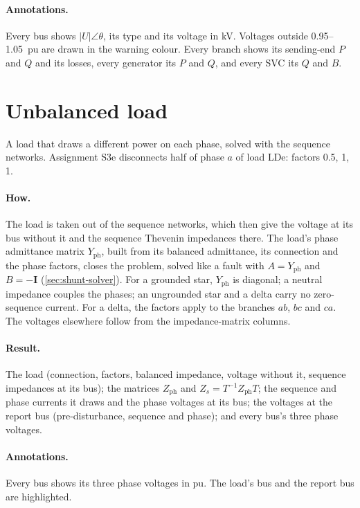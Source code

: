 \paragraph{Annotations.} Every bus shows $|U|\angle\theta$, its type and its voltage in kV.
Voltages outside 0.95--1.05~pu are drawn in the warning colour. Every branch shows its
sending-end $P$ and $Q$ and its losses, every generator its $P$ and $Q$, and every SVC
its $Q$ and $B$.

\section{Unbalanced load}\label{sec:study-unbalanced}

A load that draws a different power on each phase, solved with the sequence networks.
Assignment S3e disconnects half of phase $a$ of load LDe: factors 0.5, 1, 1.



\paragraph{How.} The load is taken out of the sequence networks, which then give the
voltage at its bus without it and the sequence Thevenin impedances there. The load's
phase admittance matrix $Y_\text{ph}$, built from its balanced admittance, its connection
and the phase factors, closes the problem, solved like a fault with $A = Y_\text{ph}$ and
$B = -\mathbf{I}$ (\cref{sec:shunt-solver}). For a grounded star, $Y_\text{ph}$ is
diagonal; a neutral impedance couples the phases; an ungrounded star and a delta carry no
zero-sequence current. For a delta, the factors apply to the branches $ab$, $bc$ and
$ca$. The voltages elsewhere follow from the impedance-matrix columns.

\paragraph{Result.} The load (connection, factors, balanced impedance, voltage without it,
sequence impedances at its bus); the matrices $Z_\text{ph}$ and $Z_s = T^{-1}Z_\text{ph}T$;
the sequence and phase currents it draws and the phase voltages at its bus; the voltages
at the report bus (pre-disturbance, sequence and phase); and every bus's three phase
voltages.

\paragraph{Annotations.} Every bus shows its three phase voltages in pu. The load's bus
and the report bus are highlighted.
